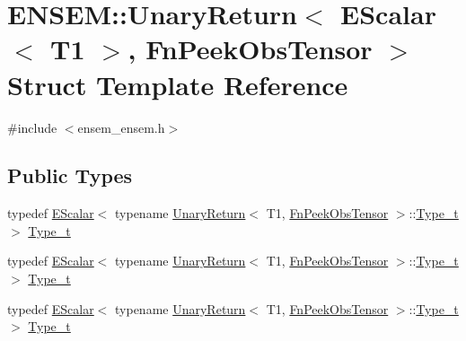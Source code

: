 \hypertarget{structENSEM_1_1UnaryReturn_3_01EScalar_3_01T1_01_4_00_01FnPeekObsTensor_01_4}{}\section{E\+N\+S\+EM\+:\+:Unary\+Return$<$ E\+Scalar$<$ T1 $>$, Fn\+Peek\+Obs\+Tensor $>$ Struct Template Reference}
\label{structENSEM_1_1UnaryReturn_3_01EScalar_3_01T1_01_4_00_01FnPeekObsTensor_01_4}


{\ttfamily \#include $<$ensem\+\_\+ensem.\+h$>$}

\subsection*{Public Types}
\begin{DoxyCompactItemize}
\item 
typedef \mbox{\hyperlink{classENSEM_1_1EScalar}{E\+Scalar}}$<$ typename \mbox{\hyperlink{structENSEM_1_1UnaryReturn}{Unary\+Return}}$<$ T1, \mbox{\hyperlink{structENSEM_1_1FnPeekObsTensor}{Fn\+Peek\+Obs\+Tensor}} $>$\+::\mbox{\hyperlink{structENSEM_1_1UnaryReturn_3_01EScalar_3_01T1_01_4_00_01FnPeekObsTensor_01_4_aebe42fb1bfefa3588cabc7286faabe45}{Type\+\_\+t}} $>$ \mbox{\hyperlink{structENSEM_1_1UnaryReturn_3_01EScalar_3_01T1_01_4_00_01FnPeekObsTensor_01_4_aebe42fb1bfefa3588cabc7286faabe45}{Type\+\_\+t}}
\item 
typedef \mbox{\hyperlink{classENSEM_1_1EScalar}{E\+Scalar}}$<$ typename \mbox{\hyperlink{structENSEM_1_1UnaryReturn}{Unary\+Return}}$<$ T1, \mbox{\hyperlink{structENSEM_1_1FnPeekObsTensor}{Fn\+Peek\+Obs\+Tensor}} $>$\+::\mbox{\hyperlink{structENSEM_1_1UnaryReturn_3_01EScalar_3_01T1_01_4_00_01FnPeekObsTensor_01_4_aebe42fb1bfefa3588cabc7286faabe45}{Type\+\_\+t}} $>$ \mbox{\hyperlink{structENSEM_1_1UnaryReturn_3_01EScalar_3_01T1_01_4_00_01FnPeekObsTensor_01_4_aebe42fb1bfefa3588cabc7286faabe45}{Type\+\_\+t}}
\item 
typedef \mbox{\hyperlink{classENSEM_1_1EScalar}{E\+Scalar}}$<$ typename \mbox{\hyperlink{structENSEM_1_1UnaryReturn}{Unary\+Return}}$<$ T1, \mbox{\hyperlink{structENSEM_1_1FnPeekObsTensor}{Fn\+Peek\+Obs\+Tensor}} $>$\+::\mbox{\hyperlink{structENSEM_1_1UnaryReturn_3_01EScalar_3_01T1_01_4_00_01FnPeekObsTensor_01_4_aebe42fb1bfefa3588cabc7286faabe45}{Type\+\_\+t}} $>$ \mbox{\hyperlink{structENSEM_1_1UnaryReturn_3_01EScalar_3_01T1_01_4_00_01FnPeekObsTensor_01_4_aebe42fb1bfefa3588cabc7286faabe45}{Type\+\_\+t}}
\end{DoxyCompactItemize}


